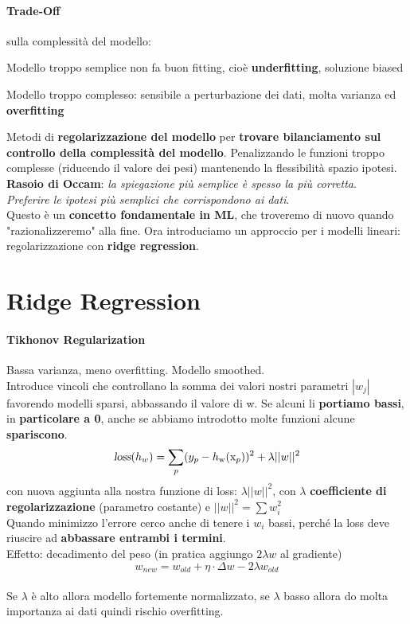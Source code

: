 \documentclass[10pt]{book}
\begin{document}
\paragraph{Trade-Off} sulla complessità del modello:
\begin{list}{}{}
	\item Modello troppo semplice non fa buon fitting, cioè \textbf{underfitting}, soluzione biased
	\item Modello troppo complesso: sensibile a perturbazione dei dati, molta varianza ed \textbf{overfitting}
\end{list}
Metodi di \textbf{regolarizzazione del modello} per \textbf{trovare bilanciamento sul controllo della complessità del modello}. Penalizzando le funzioni troppo complesse (riducendo il valore dei pesi) mantenendo la flessibilità spazio ipotesi.\\
\textbf{Rasoio di Occam}: \textit{la spiegazione più semplice è spesso la più corretta}.\\\textit{Preferire le ipotesi più semplici che corrispondono ai dati}.\\
Questo è un \textbf{concetto fondamentale in ML}, che troveremo di nuovo quando "razionalizzeremo" alla fine. Ora introduciamo un approccio per i modelli lineari: regolarizzazione con \textbf{ridge regression}.
\pagebreak
\section{Ridge Regression}
\paragraph{Tikhonov Regularization} Bassa varianza, meno overfitting. Modello smoothed.\\
Introduce vincoli che controllano la somma dei valori nostri parametri $|w_j|$ favorendo modelli sparsi, abbassando il valore di w. Se alcuni li \textbf{portiamo bassi}, in \textbf{particolare a 0}, anche se abbiamo introdotto molte funzioni alcune \textbf{spariscono}.
$$\textsl{loss}(h_w) = \sum_p (y_p - h_\text{w}(\text{x}_p))^2 + \lambda ||w||^2 $$ con nuova aggiunta alla nostra funzione di loss: $\lambda ||w||^2$, con $\lambda$ \textbf{coefficiente di regolarizzazione} (parametro costante) e $||w||^2 = \sum w_i^2$\\
Quando minimizzo l'errore cerco anche di tenere i $w_i$ bassi, perché la loss deve riuscire ad \textbf{abbassare entrambi i termini}.\\
Effetto: decadimento del peso (in pratica aggiungo $2\lambda w$ al gradiente)
$$w_{new} = w_{old} + \eta\cdot\Delta w - 2\lambda w_{old}$$\\
Se $\lambda$ è alto allora modello fortemente normalizzato, se $\lambda$ basso allora do molta importanza ai dati quindi rischio overfitting.
\end{document}
